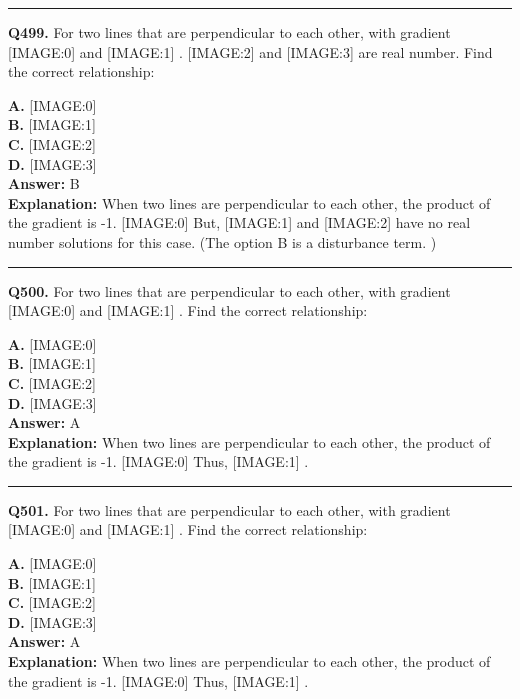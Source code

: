 \documentclass[12pt]{article}
\begin{document}
\hrule
\vspace{1em}


\noindent
\textbf{Q499.} For two lines that are perpendicular to each other, with gradient
[IMAGE:0]
and
[IMAGE:1]
.
[IMAGE:2]
and
[IMAGE:3]
are real number.
Find the correct relationship:



\textbf{A.} [IMAGE:0] \\
\textbf{B.} [IMAGE:1] \\
\textbf{C.} [IMAGE:2] \\
\textbf{D.} [IMAGE:3] \\

\textbf{Answer:} B \\
\textbf{Explanation:} When two lines are perpendicular to each other, the product of the gradient is -1.
[IMAGE:0]
But,
[IMAGE:1]
and
[IMAGE:2]
have no real number solutions for this case. (The option B is a disturbance term. )

\hrule
\vspace{1em}


\noindent
\textbf{Q500.} For two lines that are perpendicular to each other, with gradient
[IMAGE:0]
and
[IMAGE:1]
.
Find the correct relationship:



\textbf{A.} [IMAGE:0] \\
\textbf{B.} [IMAGE:1] \\
\textbf{C.} [IMAGE:2] \\
\textbf{D.} [IMAGE:3] \\

\textbf{Answer:} A \\
\textbf{Explanation:} When two lines are perpendicular to each other, the product of the gradient is -1.
[IMAGE:0]
Thus,
[IMAGE:1]
.

\hrule
\vspace{1em}


\noindent
\textbf{Q501.} For two lines that are perpendicular to each other, with gradient
[IMAGE:0]
and
[IMAGE:1]
.
Find the correct relationship:



\textbf{A.} [IMAGE:0] \\
\textbf{B.} [IMAGE:1] \\
\textbf{C.} [IMAGE:2] \\
\textbf{D.} [IMAGE:3] \\

\textbf{Answer:} A \\
\textbf{Explanation:} When two lines are perpendicular to each other, the product of the gradient is -1.
[IMAGE:0]
Thus,
[IMAGE:1]
.
\end{document}
